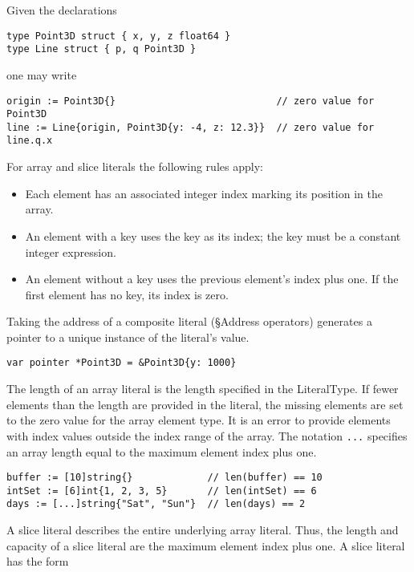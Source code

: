 Given the declarations

\begin{Verbatim}[frame=single]
type Point3D struct { x, y, z float64 }
type Line struct { p, q Point3D }
\end{Verbatim}

one may write

\begin{Verbatim}[frame=single]
origin := Point3D{}                            // zero value for Point3D
line := Line{origin, Point3D{y: -4, z: 12.3}}  // zero value for line.q.x
\end{Verbatim}

For array and slice literals the following rules apply:

\begin{itemize}
\item
  Each element has an associated integer index marking its position in
  the array.
\item
  An element with a key uses the key as its index; the key must be a
  constant integer expression.
\item
  An element without a key uses the previous element's index plus one.
  If the first element has no key, its index is zero.
\end{itemize}

Taking the address of a composite literal
(§Address operators) generates a pointer
to a unique instance of the literal's value.

\begin{Verbatim}[frame=single]
var pointer *Point3D = &Point3D{y: 1000}
\end{Verbatim}

The length of an array literal is the length specified in the
LiteralType. If fewer elements than the length are provided in the
literal, the missing elements are set to the zero value for the array
element type. It is an error to provide elements with index values
outside the index range of the array. The notation \texttt{...}
specifies an array length equal to the maximum element index plus one.

\begin{Verbatim}[frame=single]
buffer := [10]string{}             // len(buffer) == 10
intSet := [6]int{1, 2, 3, 5}       // len(intSet) == 6
days := [...]string{"Sat", "Sun"}  // len(days) == 2
\end{Verbatim}

A slice literal describes the entire underlying array literal. Thus, the
length and capacity of a slice literal are the maximum element index
plus one. A slice literal has the form

